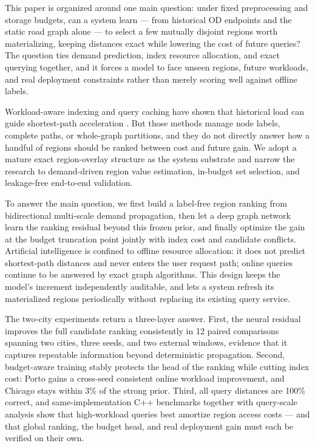 \documentclass[5p,twocolumn,authoryear]{elsarticle}
\begin{document}
This paper is organized around one main question: under fixed preprocessing and
storage budgets, can a system learn --- from historical OD endpoints and the static
road graph alone --- to select a few mutually disjoint regions worth materializing,
keeping distances exact while lowering the cost of future queries? The question ties
demand prediction, index resource allocation, and exact querying together, and it
forces a model to face unseen regions, future workloads, and real deployment
constraints rather than merely scoring well against offline labels.

Workload-aware indexing and query caching have shown that historical load can guide
shortest-path acceleration \citep{wan2022wcf,dan2025fahl,thomsen2012cache,li2020cache}.
But those methods manage node labels, complete paths, or whole-graph partitions, and
they do not directly answer how a handful of regions should be ranked between cost and
future gain. We adopt a mature exact region-overlay structure as the system substrate
and narrow the research to demand-driven region value estimation, in-budget set
selection, and leakage-free end-to-end validation.

To answer the main question, we first build a label-free region ranking from
bidirectional multi-scale demand propagation, then let a deep graph network learn the
ranking residual beyond this frozen prior, and finally optimize the gain at the budget
truncation point jointly with index cost and candidate conflicts. Artificial
intelligence is confined to offline resource allocation: it does not predict
shortest-path distances and never enters the user request path; online queries continue
to be answered by exact graph algorithms. This design keeps the model's increment
independently auditable, and lets a system refresh its materialized regions
periodically without replacing its existing query service.

The two-city experiments return a three-layer answer. First, the neural residual
improves the full candidate ranking consistently in 12 paired comparisons spanning two
cities, three seeds, and two external windows, evidence that it captures repeatable
information beyond deterministic propagation. Second, budget-aware training stably
protects the head of the ranking while cutting index cost: Porto gains a cross-seed
consistent online workload improvement, and Chicago stays within 3\% of the strong
prior. Third, all query distances are 100\% correct, and same-implementation C++
benchmarks together with query-scale analysis show that high-workload queries best
amortize region access costs --- and that global ranking, the budget head, and real
deployment gain must each be verified on their own.
\end{document}
